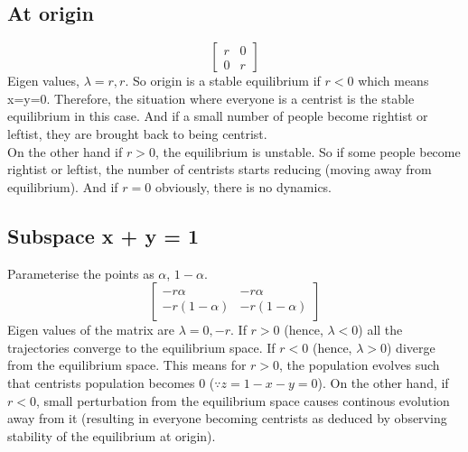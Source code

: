 \documentclass{article}
\begin{document}
\subsection*{At origin}
\begin{equation}
    \begin{bmatrix} r & 0 \\ 0 & r \end{bmatrix}
\end{equation}
Eigen values, $\lambda = r,r$. So origin is a stable equilibrium if $r<0$ which means x=y=0. Therefore, the situation where everyone is a centrist is the stable equilibrium in this case. And if a small number of people become rightist or leftist, they are brought back to being centrist. \\
On the other hand if $r>0$, the equilibrium is unstable. So if some people become rightist or leftist, the number of centrists starts reducing (moving away from equilibrium). And if $r=0$ obviously, there is no dynamics.\\
\subsection*{Subspace x + y = 1}
Parameterise the points as $\alpha$, $1-\alpha$.
\begin{equation}
    \begin{bmatrix} -r\alpha & -r\alpha \\ -r(1-\alpha) & -r(1-\alpha) \end{bmatrix}
\end{equation}
Eigen values of the matrix are $\lambda = 0, -r$.
If $r>0$ (hence, $\lambda<0$) all the trajectories converge to the equilibrium space. If $r<0$ (hence, $\lambda>0$) diverge from the equilibrium space. This means for $r>0$, the population evolves such that centrists population becomes 0 ($\because z = 1 - x - y = 0$). On the other hand, if $r<0$, small perturbation from the equilibrium space causes continous evolution away from it (resulting in everyone becoming centrists as deduced by observing stability of the equilibrium at origin).
\end{document}
